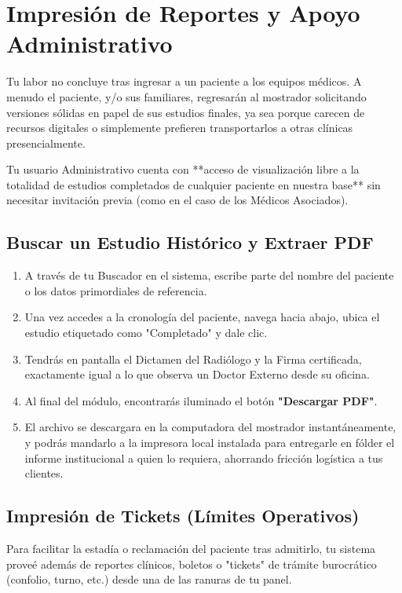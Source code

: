 \section{Impresión de Reportes y Apoyo Administrativo}

Tu labor no concluye tras ingresar a un paciente a los equipos médicos. A menudo el paciente, y/o sus familiares, regresarán al mostrador solicitando versiones sólidas en papel de sus estudios finales, ya sea porque carecen de recursos digitales o simplemente prefieren transportarlos a otras clínicas presencialmente. 

Tu usuario Administrativo cuenta con **acceso de visualización libre a la totalidad de estudios completados de cualquier paciente en nuestra base** sin necesitar invitación previa (como en el caso de los Médicos Asociados).

\subsection{Buscar un Estudio Histórico y Extraer PDF}

\begin{enumerate}
    \item A través de tu Buscador en el sistema, escribe parte del nombre del paciente o los datos primordiales de referencia.
    \item Una vez accedes a la cronología del paciente, navega hacia abajo, ubica el estudio etiquetado como "Completado" y dale clic.
    \item Tendrás en pantalla el Dictamen del Radiólogo y la Firma certificada, exactamente igual a lo que observa un Doctor Externo desde su oficina.
    \item Al final del módulo, encontrarás iluminado el botón \textbf{"Descargar PDF"}.
    \item El archivo se descargara en la computadora del mostrador instantáneamente, y podrás mandarlo a la impresora local instalada para entregarle en fólder el informe institucional a quien lo requiera, ahorrando fricción logística a tus clientes.
\end{enumerate}

\subsection{Impresión de Tickets (\textbf{Límites Operativos})}

Para facilitar la estadía o reclamación del paciente tras admitirlo, tu sistema proveé además de reportes clínicos, boletos o "tickets" de trámite burocrático (confolio, turno, etc.) desde una de las ranuras de tu panel.

